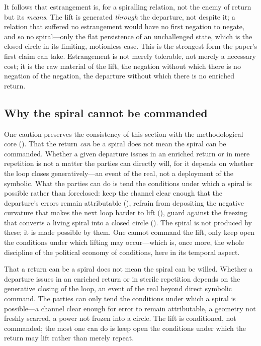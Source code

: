 It follows that estrangement is, for a spiralling relation, not the enemy of return but its \emph{means}. The lift is generated \emph{through} the departure, not despite it; a relation that suffered no estrangement would have no first negation to negate, and so no spiral---only the flat persistence of an unchallenged state, which is the closed circle in its limiting, motionless case. This is the strongest form the paper's first claim can take. Estrangement is not merely tolerable, not merely a necessary cost; it is the raw material of the lift, the negation without which there is no negation of the negation, the departure without which there is no enriched return.

\subsection{Why the spiral cannot be commanded}
\label{p17:sub:return-cannot}

One caution preserves the consistency of this section with the methodological core (). That the return \emph{can} be a spiral does not mean the spiral can be commanded. Whether a given departure issues in an enriched return or in mere repetition is not a matter the parties can directly will, for it depends on whether the loop closes generatively---an event of the real, not a deployment of the symbolic. What the parties can do is tend the conditions under which a spiral is possible rather than foreclosed: keep the channel clear enough that the departure's errors remain attributable (), refrain from depositing the negative curvature that makes the next loop harder to lift (), guard against the freezing that converts a living spiral into a closed circle (). The spiral is not produced by these; it is made possible by them. One cannot command the lift, only keep open the conditions under which lifting may occur---which is, once more, the whole discipline of the political economy of conditions, here in its temporal aspect.

\begin{claim}
That a return can be a spiral does not mean the spiral can be willed. Whether a departure issues in an enriched return or in sterile repetition depends on the generative closing of the loop, an event of the real beyond direct symbolic command. The parties can only tend the conditions under which a spiral is possible---a channel clear enough for error to remain attributable, a geometry not freshly scarred, a power not frozen into a circle. The lift is conditioned, not commanded; the most one can do is keep open the conditions under which the return may lift rather than merely repeat.
\end{claim}

